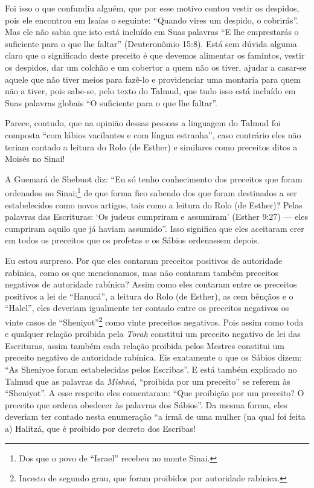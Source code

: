 Foi isso o que confundiu alguém, que por esse motivo contou vestir os
despidos, pois ele encontrou em Isaías o seguinte: ``Quando vires um
despido, o cobrirás''. Mas ele não sabia que isto está incluído em Suas
palavras ``E lhe emprestarás o suficiente para o que lhe faltar''
(Deuteronômio 15:8). Está sem dúvida alguma claro que o significado
deste preceito é que devemos alimentar os famintos, vestir os despidos,
dar um colchão e um cobertor a quem não os tiver, ajudar a casar-se
aquele que não tiver meios para fazê-lo e providenciar uma montaria
para quem não a tiver, pois sabe-se, pelo texto do Talmud, que tudo
isso está incluído em Suas palavras globais ``O suficiente para o que
lhe faltar''.

Parece, contudo, que na opinião dessas pessoas a linguagem do Talmud
foi composta ``com lábios vacilantes e com língua estranha'', caso
contrário eles não teriam contado a leitura do Rolo (de Esther) e
similares como preceitos ditos a Moisés no Sinai!

A Guemará de Shebuot diz: ``Eu só tenho conhecimento dos preceitos que foram ordenados no Sinai;\footnote{Dos que o povo de ``Israel'' recebeu no monte Sinai.} de que forma fico sabendo dos que foram
destinados a ser estabelecidos como novos artigos, tais como a leitura
do Rolo
(de Esther)? Pelas palavras das Escrituras: `Os judeus cumpriram e
assumiram' (Esther 9:27) --- eles cumpriram aquilo que já haviam
assumido''. Isso significa que eles aceitaram crer em todos os preceitos
que os profetas e os Sábios ordenassem depois.

Eu estou surpreso. Por que eles contaram preceitos positivos de
autoridade rabínica, como os que mencionamos, mas não contaram também
preceitos negativos de autoridade rabínica? Assim como eles contaram
entre os preceitos positivos a lei de ``Hanucá'', a leitura do Rolo (de
Esther), as cem bênçãos e o ``Halel'', eles deveriam igualmente ter
contado entre os preceitos negativos os vinte casos de
``Sheniyot''\footnote{Incesto de segundo grau, que foram proibidos por autoridade rabínica.} como vinte preceitos negativos. Pois
assim como toda e qualquer relação proibida pela \emph{Torah} constitui um
preceito negativo de lei das Escrituras, assim também cada relação
proibida pelos Mestres constitui um preceito negativo de autoridade
rabínica. Eis exatamente o que os Sábios dizem: ``As
Sheniyoe foram estabelecidas pelos Escribas''. E
está também explicado no Talmud que as palavras da \emph{Mishná},
``proibida por um preceito'' se referem às ``Sheniyot''. A esse respeito
eles comentaram: ``Que proibição por um preceito? O preceito que ordena
obedecer às palavras dos Sábios''. Da mesma forma, eles deveriam ter
contado nesta enumeração ``a irmã de uma mulher (na qual foi feita a)
Halitzá, que é proibido por decreto dos Escribas!

